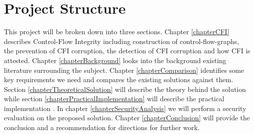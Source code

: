 \section{Project Structure}

This project will be broken down into three sections. Chapter \ref{chapterCFI} describes Control-Flow Integrity including construction of control-flow-graphs, the prevention of CFI corruption, the detection of CFI corruption and how CFI is attested. Chapter \ref{chapterBackground} looks into the background existing literature surrounding the subject. Chapter \ref{chapterComparison} identifies some key requirements we need and compares the existing solutions against them. Section \ref{chapterTheoreticalSolution} will describe the theory behind the solution
\ifnotesincluded 
while section \ref{chapterPracticalImplementation} will describe the practical implementation
\fi
. In chapter \ref{chapterSecurityAnalysis} we will perform a security evaluation on the proposed solution. 
\ifnotesincluded
Chapter \ref{chapterConclusion} will provide the conclusion and a recommendation for directions for further work.
\fi
